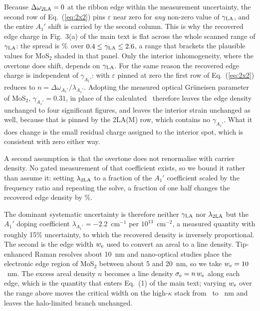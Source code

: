\documentclass[aip,apl,amsmath,amssymb,reprint,longbibliography]{revtex4-1}
\begin{document}
Because $\Delta\omega_{2\rm LA}=0$ at the ribbon edge within the measurement
uncertainty, the second row of Eq.~(\ref{eq:2x2}) pins $\varepsilon$ near zero
for \emph{any} non-zero value of $\gamma_{\rm LA}$, and the entire $A_1'$
shift is carried by the second column. This is why the recovered edge charge
in Fig.~3(a) of the main text is flat across the whole scanned range of
$\gamma_{\rm LA}$: the spread is \EdgeNspread\%\ over
$0.4\le\gamma_{\rm LA}\le2.6$, a range that brackets the plausible values for
MoS$_2$ shaded in that panel. Only the interior inhomogeneity, where the
overtone does shift, depends on $\gamma_{\rm LA}$. For the same reason the
recovered edge charge is independent of $\gamma_{A_1'}$: with
$\varepsilon$ pinned at zero the first row of Eq.~(\ref{eq:2x2}) reduces to
$n=\Delta\omega_{A_1'}/\lambda_{A_1'}$. Adopting the measured optical
Gr\"uneisen parameter of MoS$_2$, $\gamma_{A_1'}=0.31$, in place of the
calculated \gAdftMoSTwo\ therefore leaves the edge density unchanged to four
significant figures, and leaves the interior strain unchanged as well, because
that is pinned by the 2LA(M) row, which contains no $\gamma_{A_1'}$. What it
does change is the small residual charge assigned to the interior spot, which
is consistent with zero either way.

A second assumption is that the overtone does not renormalise with carrier
density. No gated measurement of that coefficient exists, so we bound it
rather than assume it: setting $\lambda_{2\rm LA}$ to a fraction of the $A_1'$
coefficient scaled by the frequency ratio and repeating the solve, a fraction
of one half changes the recovered edge density by \OvertoneBound\%.

The dominant systematic uncertainty is therefore neither $\gamma_{\rm LA}$ nor
$\lambda_{2\rm LA}$ but the $A_1'$ doping coefficient
$\lambda_{A_1'}=-2.2$~cm$^{-1}$ per $10^{13}$~cm$^{-2}$, a measured quantity
with roughly 15\% uncertainty, to which the recovered density is inversely
proportional. The second is the edge width $w_{\rm e}$ used to convert an
areal to a line density. Tip-enhanced Raman resolves about 10~nm and
nano-optical studies place the electronic edge region of MoS$_2$ between about
5 and 20~nm,\cite{Su2019,Wu2016} so we take $w_{\rm e}=10$~nm. The excess
areal density $n$ becomes a line density
$\sigma_{\rm e}=n\,w_{\rm e}$ along each edge, which is the quantity that
enters Eq.~(1) of the main text; varying $w_{\rm e}$ over the range above moves
the critical width on the high-$\kappa$ stack from \WcHfOwFive\ to
\WcHfOwTwenty~nm and leaves the halo-limited branch unchanged.
\end{document}
